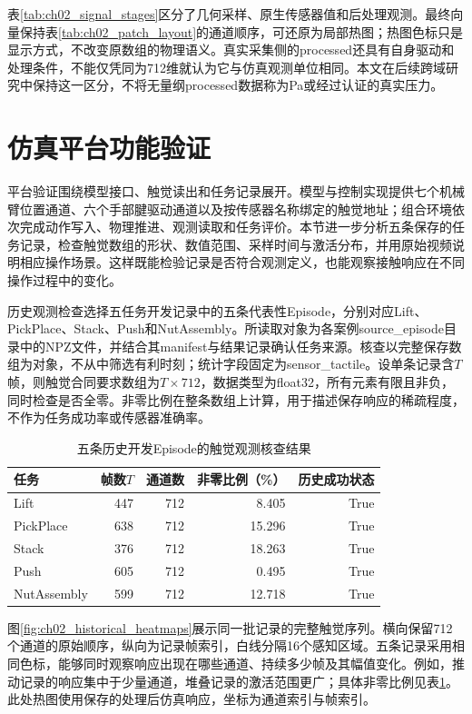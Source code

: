 表\ref{tab:ch02_signal_stages}区分了几何采样、原生传感器值和后处理观测。最终向量保持表\ref{tab:ch02_patch_layout}的通道顺序，可还原为局部热图；热图色标只是显示方式，不改变原数组的物理语义。真实采集侧的processed还具有自身驱动和处理条件，不能仅凭同为712维就认为它与仿真观测单位相同。本文在后续跨域研究中保持这一区分，不将无量纲processed数据称为Pa或经过认证的真实压力。

\section{仿真平台功能验证}
\label{sec:platform_validation}

平台验证围绕模型接口、触觉读出和任务记录展开。模型与控制实现提供七个机械臂位置通道、六个手部腱驱动通道以及按传感器名称绑定的触觉地址；组合环境依次完成动作写入、物理推进、观测读取和任务评价。本节进一步分析五条保存的任务记录，检查触觉数组的形状、数值范围、采样时间与激活分布，并用原始视频说明相应操作场景。这样既能检验记录是否符合观测定义，也能观察接触响应在不同操作过程中的变化。

历史观测检查选择五任务开发记录中的五条代表性Episode，分别对应Lift、PickPlace、Stack、Push和NutAssembly。所读取对象为各案例source\_episode目录中的NPZ文件，并结合其manifest与结果记录确认任务来源。核查以完整保存数组为对象，不从中筛选有利时刻；统计字段固定为sensor\_tactile。设单条记录含$T$帧，则触觉合同要求数组为$T\times712$，数据类型为float32，所有元素有限且非负，同时检查是否全零。非零比例在整条数组上计算，用于描述保存响应的稀疏程度，不作为任务成功率或传感器准确率。

\begin{table}[htbp]
  \centering\small
  \caption{五条历史开发Episode的触觉观测核查结果}
  \label{tab:ch02_episode_validation}
  \begin{tabular}{lrrrr}
    \hline
    任务 & 帧数$T$ & 通道数 & 非零比例（\%） & 历史成功状态\\
    \hline
    Lift & 447 & 712 & 8.405 & True\\
    PickPlace & 638 & 712 & 15.296 & True\\
    Stack & 376 & 712 & 18.263 & True\\
    Push & 605 & 712 & 0.495 & True\\
    NutAssembly & 599 & 712 & 12.718 & True\\
    \hline
  \end{tabular}
\end{table}

图\ref{fig:ch02_historical_heatmaps}展示同一批记录的完整触觉序列。横向保留712个通道的原始顺序，纵向为记录帧索引，白线分隔16个感知区域。五条记录采用相同色标，能够同时观察响应出现在哪些通道、持续多少帧及其幅值变化。例如，推动记录的响应集中于少量通道，堆叠记录的激活范围更广；具体非零比例见表\ref{tab:ch02_episode_validation}。此处热图使用保存的处理后仿真响应，坐标为通道索引与帧索引。

